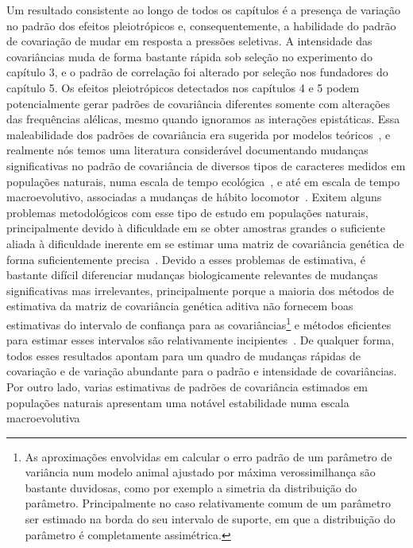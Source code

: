 \begin{refsection}
Um resultado consistente ao longo de todos os capítulos é a presença de
variação no padrão dos efeitos pleiotrópicos e, consequentemente, a habilidade
do padrão de covariação de mudar em resposta a pressões seletivas. A
intensidade das covariâncias muda de forma bastante rápida sob seleção no
experimento do capítulo 3, e o padrão de correlação foi alterado por seleção
nos fundadores do capítulo 5. Os efeitos pleiotrópicos detectados nos
capítulos 4 e 5 podem potencialmente gerar padrões de covariância diferentes
somente com alterações das frequências alélicas, mesmo quando ignoramos as
interações epistáticas. Essa maleabilidade dos padrões de covariância era
sugerida por modelos teóricos~\parencite{Barton1989-ag, Arnold2008-pc}, e
realmente nós temos uma literatura considerável documentando mudanças
significativas no padrão de covariância de diversos tipos de caracteres
medidos em populações naturais, numa escala de tempo
ecológica~\parencite{Merila1996-rw, Doroszuk2008-qe, Bjorklund2013-io,
Pfrender2000-if, Eroukhmanoff2011-ph}, e até em escala de tempo
macroevolutivo, associadas a mudanças de hábito
locomotor~\parencite{Young2005-nk, Young2010-rm}. Exitem alguns problemas
metodológicos com esse tipo de estudo em populações naturais, principalmente
devido à dificuldade em se obter amostras grandes o suficiente aliada à
dificuldade inerente em se estimar uma matriz de covariância genética de forma
suficientemente precisa~\parencite{Marroig2012-jd}. Devido a esses problemas
de estimativa, é bastante difícil diferenciar mudanças biologicamente
relevantes de mudanças significativas mas irrelevantes, principalmente porque
a maioria dos métodos de estimativa da matriz de covariância genética aditiva
não fornecem boas estimativas do intervalo de confiança para as
covariâncias\footnote{As aproximações envolvidas em calcular o erro padrão de
um parâmetro de variância num modelo animal ajustado por máxima
verossimilhança são bastante duvidosas, como por exemplo a simetria da
distribuição do parâmetro. Principalmente no caso relativamente comum de um
parâmetro ser estimado na borda do seu intervalo de suporte, em que a
distribuição do parâmetro é completamente assimétrica.} e métodos eficientes
para estimar esses intervalos são relativamente
incipientes~\parencite{Houle2015-jb, Runcie2013-nr}. De qualquer forma, todos
esses resultados apontam para um quadro de mudanças rápidas de covariação e de
variação abundante para o padrão e intensidade de covariâncias. Por outro
lado, varias estimativas de padrões de covariância estimados em populações
naturais apresentam uma notável estabilidade numa escala macroevolutiva

\end{refsection}
